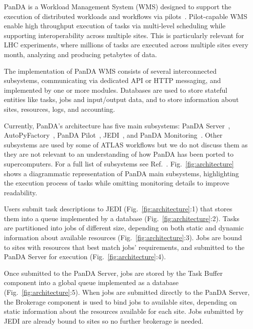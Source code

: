 
PanDA is a Workload Management System (WMS) %
designed to support the execution of distributed workloads and workflows via
pilots~\cite{turilli2017comprehensive}. Pilot-capable WMS enable high
throughput execution of tasks via multi-level scheduling while supporting
interoperability across multiple sites. This is particularly relevant for LHC
experiments, where millions of tasks are executed across multiple sites every
month, analyzing and producing petabytes of data. 

The implementation of PanDA WMS consists of several interconnected
subsystems, communicating via dedicated API or HTTP messaging, and
implemented by one or more modules. Databases are used to store stateful
entities like tasks, jobs and input/output data, and to store information
about sites, resources, logs, and accounting.

Currently, PanDA's architecture has five main subsystems: PanDA
Server~\cite{maeno2011overview},
AutoPyFactory~\cite{caballero2012autopyfactory}, PanDA
Pilot~\cite{nilsson2011atlas}, JEDI~\cite{borodin2015scaling}, and PanDA
Monitoring~\cite{klimentov2011atlas}. Other subsystems are used by some of
ATLAS workflows but we do not discuss them as they are not relevant to an
understanding of how PanDA has been ported to supercomputers. For a full list
of subsystems see Ref.~\cite{panda-wiki_url}. Fig.~\ref{fig:architecture}
shows a diagrammatic representation of PanDA main subsystems, highlighting
the execution process of tasks while omitting monitoring details to improve
readability.

Users submit task descriptions to JEDI (Fig.~\ref{fig:architecture}:1) that
stores them into a queue implemented by a database
(Fig.~\ref{fig:architecture}:2). Tasks are partitioned into jobs of different
size, depending on both static and dynamic information about available
resources (Fig.~\ref{fig:architecture}:3). Jobs are bound to sites with
resources that best match jobs' requirements, and submitted to the PanDA
Server for execution (Fig.~\ref{fig:architecture}:4).

Once submitted to the PanDA Server, jobs are stored by the Task Buffer
component into a global queue implemented as a database
(Fig.~\ref{fig:architecture}:5). When jobs are submitted directly to the
PanDA Server, the Brokerage component is used to bind jobs to available
sites, depending on static information about the resources available for each
site. Jobs submitted by JEDI are already bound to sites so no further
brokerage is needed.


